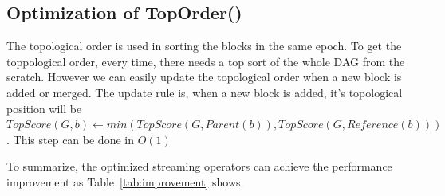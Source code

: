 \subsection{Optimization of TopOrder()}
The topological order is used in sorting the blocks in the same epoch.
To get the toppological order, every time, there needs a top sort of the whole DAG from the scratch.
However we can easily update the topological order when a new block is added or merged.
 The update rule is, when a new block is added, it's topological position will be $TopScore(G, b) \gets min(TopScore(G, Parent(b)), TopScore(G, Reference(b)))$. This step can be done in $O(1)$ 


To summarize, the optimized streaming operators can achieve the performance improvement as Table~\ref{tab:improvement} shows. 

\begin{table}[]
\caption {Analysis of Graph properties calculation} \label{tab:improvement}
\begin{center}
\end{center}
\end{table}



